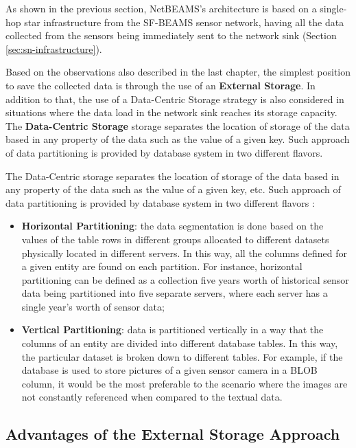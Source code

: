As shown in the previous section, NetBEAMS's architecture is based on a
single-hop star infrastructure from the SF-BEAMS sensor network, having all the
data collected from the sensors being immediately sent to the network sink
(Section \ref{sec:sn-infrastructure}).

Based on the observations also described in the last chapter, the simplest
position to save the collected data is through the use of an \textbf{External
Storage}. In addition to that, the use of a Data-Centric Storage strategy is
also considered in situations where the data load in the network sink reaches
its storage capacity. The \textbf{Data-Centric Storage} storage separates the
location of storage of the data based in any property of the data such as the
value of a given key. Such approach of data partitioning is provided by
database system in two different flavors.

The Data-Centric storage separates the location of storage of the data based in
any property of the data such as the value of a given key, etc. Such approach
of data partitioning is provided by database system in two different flavors
\cite{db-partitioning-relational}:

\begin{itemize}
  \item \textbf{Horizontal Partitioning}: the data segmentation is done based
  on the values of the table rows in different groups allocated to different
  datasets physically located in different servers. In this way, all the
  columns defined for a given entity are found on each partition. For instance,
  horizontal partitioning can be defined as a collection five years worth of
  historical sensor data being partitioned into five separate servers, where
  each server has a single year's worth of sensor data;
  \item \textbf{Vertical Partitioning}: data is partitioned vertically in a way
  that the columns of an entity are divided into different database tables. In
  this way, the particular dataset is broken down to different tables. For
  example, if the database is used to store pictures of a given sensor camera
  in a BLOB column, it would be the most preferable to the scenario where the
  images are not constantly referenced when compared to the textual data.
\end{itemize} 

\subsection{Advantages of the External Storage Approach}

